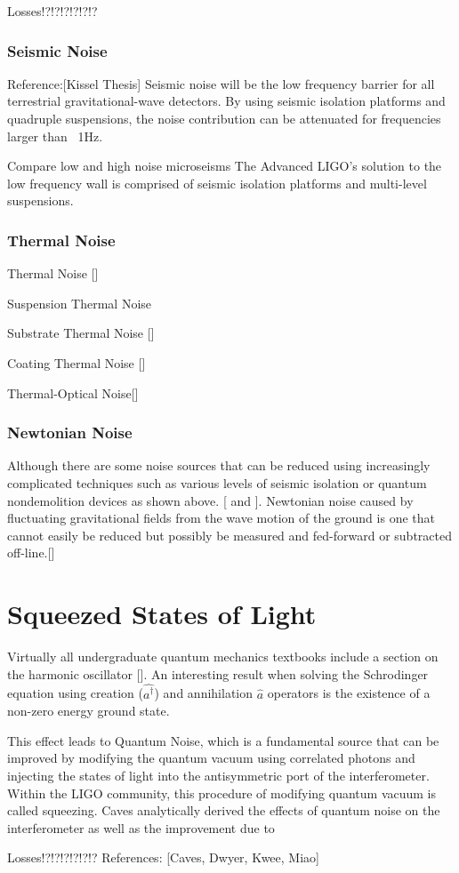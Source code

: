 		Losses!?!?!?!?!?!?
		
		\subsubsection{Seismic Noise}
		Reference:[Kissel Thesis]
		Seismic noise will be the low frequency barrier for all terrestrial gravitational-wave detectors.  By using seismic isolation platforms and quadruple suspensions, the noise contribution can be attenuated for frequencies larger than ~1Hz.
		
		Compare low and high noise microseisms
		\cite{BlairBook}
		The Advanced LIGO's solution to the low frequency wall is comprised of seismic isolation platforms and multi-level suspensions.
		
		\subsubsection{Thermal Noise}
		Thermal Noise [\cite{SaulsonThermalNoise}]
		
		Suspension Thermal Noise \cite{SaulsonThermalSus}
		
		Substrate Thermal Noise [\cite{Saulson}]
		
		Coating Thermal Noise [\cite{HarryThermalCoat}]
		
		Thermal-Optical Noise[\cite{EvansBallmerThermalOptic}]
		
		
		\subsubsection{Newtonian Noise}
		Although there are some noise sources that can be reduced using increasingly complicated techniques such as various levels of seismic isolation or quantum nondemolition devices as shown above. [\cite{SaulsonNewtonian} and \cite{ThorneNewtonian}].  Newtonian noise caused by fluctuating gravitational fields from the wave motion of the ground is one that cannot easily be reduced but possibly be measured and fed-forward or subtracted off-line.[\cite{DriggersNewtonian}]
		
	
	\section{Squeezed States of Light}

	Virtually all undergraduate quantum mechanics textbooks include a section on the harmonic oscillator [\cite{Shankar}].  An interesting result when solving the Schrodinger equation using creation ($\hat{a^{\dagger}}$) and annihilation $\hat{a}$ operators is the existence of a non-zero energy ground state. 
	
	This effect leads to Quantum Noise, which is a fundamental source that can be improved by modifying the quantum vacuum using correlated photons and injecting the states of light into the antisymmetric port of the interferometer.  Within the LIGO community, this procedure of modifying quantum vacuum is called squeezing. Caves analytically derived the effects of quantum noise on the interferometer as well as the improvement due to	
	
	Losses!?!?!?!?!?!?
	References: [Caves, Dwyer, Kwee, Miao]
	